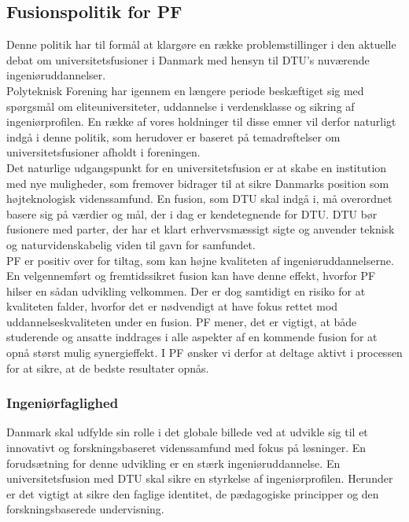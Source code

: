 \subsection{Fusionspolitik for PF}
Denne politik har til formål at klargøre en række problemstillinger i den aktuelle debat om universitetsfusioner i
Danmark med hensyn til DTU’s nuværende ingeniøruddannelser.\\

Polyteknisk Forening har igennem en længere periode beskæftiget sig med spørgsmål om eliteuniversiteter, uddannelse i verdensklasse og sikring af ingeniørprofilen. En række af vores holdninger til disse emner vil derfor naturligt indgå i denne politik, som herudover er baseret på temadrøftelser om universitetsfusioner afholdt i foreningen.\\

Det naturlige udgangspunkt for en universitetsfusion er at skabe en institution med nye muligheder, som fremover bidrager til at sikre Danmarks position som højteknologisk videnssamfund. En fusion, som DTU skal indgå i, må overordnet basere sig på værdier og mål, der i dag er kendetegnende for DTU. DTU bør fusionere med parter, der har et klart erhvervsmæssigt sigte og anvender teknisk og naturvidenskabelig viden til gavn for samfundet.\\

PF er positiv over for tiltag, som kan højne kvaliteten af ingeniøruddannelserne. En velgennemført og fremtidssikret fusion kan have denne effekt, hvorfor PF hilser en sådan udvikling velkommen. Der er dog samtidigt en risiko for at kvaliteten falder, hvorfor det er nødvendigt at have fokus rettet mod uddannelseskvaliteten under en fusion. PF mener, det er vigtigt, at både studerende og ansatte inddrages i alle aspekter af en kommende fusion for at opnå størst mulig synergieffekt. I PF ønsker vi derfor at deltage aktivt i processen for at sikre, at de bedste resultater opnås.
\subsubsection{Ingeniørfaglighed}
Danmark skal udfylde sin rolle i det globale billede ved at udvikle sig til et innovativt og forskningsbaseret videnssamfund med fokus på løsninger. En forudsætning for denne udvikling er en stærk ingeniøruddannelse. En universitetsfusion med DTU skal sikre en styrkelse af ingeniørprofilen. Herunder er det vigtigt at sikre den faglige identitet, de pædagogiske principper og den forskningsbaserede undervisning.\\

